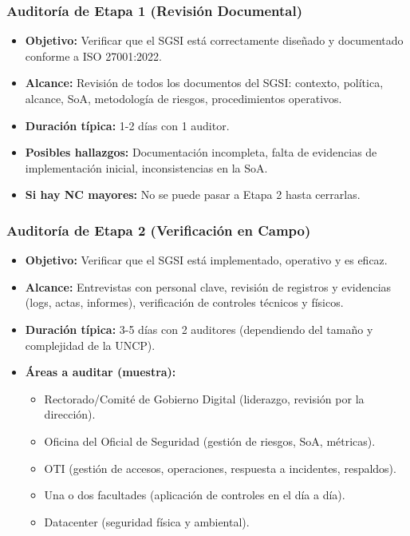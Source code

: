 \documentclass[10pt,letterpaper]{article}
\begin{document}
\subsubsection{Auditoría de Etapa 1 (Revisión
Documental)}\label{auditoruxeda-de-etapa-1-revisiuxf3n-documental}

\begin{itemize}
\tightlist
\item
  \textbf{Objetivo:} Verificar que el SGSI está correctamente diseñado y
  documentado conforme a ISO 27001:2022.
\item
  \textbf{Alcance:} Revisión de todos los documentos del SGSI: contexto,
  política, alcance, SoA, metodología de riesgos, procedimientos
  operativos.
\item
  \textbf{Duración típica:} 1-2 días con 1 auditor.
\item
  \textbf{Posibles hallazgos:} Documentación incompleta, falta de
  evidencias de implementación inicial, inconsistencias en la SoA.
\item
  \textbf{Si hay NC mayores:} No se puede pasar a Etapa 2 hasta
  cerrarlas.
\end{itemize}

\subsubsection{Auditoría de Etapa 2 (Verificación en
Campo)}\label{auditoruxeda-de-etapa-2-verificaciuxf3n-en-campo}

\begin{itemize}
\tightlist
\item
  \textbf{Objetivo:} Verificar que el SGSI está implementado, operativo
  y es eficaz.
\item
  \textbf{Alcance:} Entrevistas con personal clave, revisión de
  registros y evidencias (logs, actas, informes), verificación de
  controles técnicos y físicos.
\item
  \textbf{Duración típica:} 3-5 días con 2 auditores (dependiendo del
  tamaño y complejidad de la UNCP).
\item
  \textbf{Áreas a auditar (muestra):}

  \begin{itemize}
  \tightlist
  \item
    Rectorado/Comité de Gobierno Digital (liderazgo, revisión por la
    dirección).
  \item
    Oficina del Oficial de Seguridad (gestión de riesgos, SoA,
    métricas).
  \item
    OTI (gestión de accesos, operaciones, respuesta a incidentes,
    respaldos).
  \item
    Una o dos facultades (aplicación de controles en el día a día).
  \item
    Datacenter (seguridad física y ambiental).
  \end{itemize}
\end{itemize}
\end{document}
